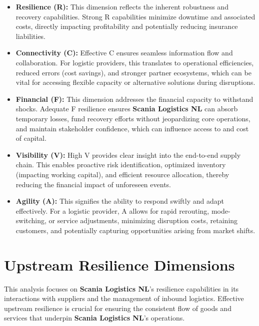\documentclass[
  oneside,
  open=any,
  fontsize=11pt]{scrbook}
\providecommand{\tightlist}{%
  \setlength{\itemsep}{0pt}\setlength{\parskip}{0pt}}
\begin{document}
\begin{itemize}
\tightlist
\item
  \textbf{Resilience (R):} This dimension reflects the inherent
  robustness and recovery capabilities. Strong R capabilities minimize
  downtime and associated costs, directly impacting profitability and
  potentially reducing insurance liabilities.
\item
  \textbf{Connectivity (C):} Effective C ensures seamless information
  flow and collaboration. For logistic providers, this translates to
  operational efficiencies, reduced errors (cost savings), and stronger
  partner ecosystems, which can be vital for accessing flexible capacity
  or alternative solutions during disruptions.
\item
  \textbf{Financial (F):} This dimension addresses the financial
  capacity to withstand shocks. Adequate F resilience ensures
  \textbf{Scania Logistics NL} can absorb temporary losses, fund
  recovery efforts without jeopardizing core operations, and maintain
  stakeholder confidence, which can influence access to and cost of
  capital.
\item
  \textbf{Visibility (V):} High V provides clear insight into the
  end-to-end supply chain. This enables proactive risk identification,
  optimized inventory (impacting working capital), and efficient
  resource allocation, thereby reducing the financial impact of
  unforeseen events.
\item
  \textbf{Agility (A):} This signifies the ability to respond swiftly
  and adapt effectively. For a logistic provider, A allows for rapid
  rerouting, mode-switching, or service adjustments, minimizing
  disruption costs, retaining customers, and potentially capturing
  opportunities arising from market shifts.
\end{itemize}

\section{Upstream Resilience
Dimensions}\label{upstream-resilience-dimensions}

This analysis focuses on \textbf{Scania Logistics NL}'s resilience
capabilities in its interactions with suppliers and the management of
inbound logistics. Effective upstream resilience is crucial for ensuring
the consistent flow of goods and services that underpin \textbf{Scania
Logistics NL}'s operations.
\end{document}
